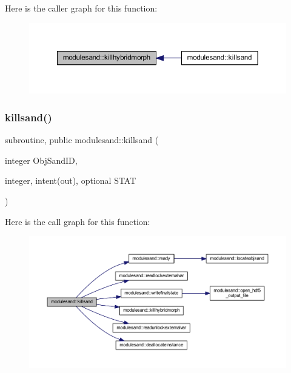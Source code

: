 Here is the caller graph for this function\+:\nopagebreak
\begin{figure}[H]
\begin{center}
\leavevmode
\includegraphics[width=350pt]{namespacemodulesand_a213ec97f902c200fd1bb472fe1490e92_icgraph}
\end{center}
\end{figure}
\mbox{\label{namespacemodulesand_a29c3265b645ec50590d4d13545918a44}} 
\subsubsection{\texorpdfstring{killsand()}{killsand()}}
{\footnotesize\ttfamily subroutine, public modulesand\+::killsand (\begin{DoxyParamCaption}\item[{integer}]{Obj\+Sand\+ID,  }\item[{integer, intent(out), optional}]{S\+T\+AT }\end{DoxyParamCaption})}

Here is the call graph for this function\+:\nopagebreak
\begin{figure}[H]
\begin{center}
\leavevmode
\includegraphics[width=350pt]{namespacemodulesand_a29c3265b645ec50590d4d13545918a44_cgraph}
\end{center}
\end{figure}
\mbox{\label{namespacemodulesand_a1cc021f53fc9b3dfb942f3a272588046}} 
